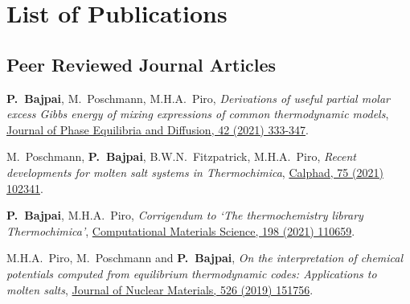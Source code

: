 \chapter*{List of Publications}
\label{publications}


\section*{Peer Reviewed Journal Articles}
\vspace*{1em}
\begin{enumerate}{\small \compresslist
    \item \textbf{P.\ Bajpai}, {M.\ Poschmann}, {M.H.A.\ Piro}, \textit{Derivations of useful partial molar excess Gibbs energy of mixing expressions of common thermodynamic models}, \href{https://doi.org/10.1007/s11669-021-00886-w}{Journal of Phase Equilibria and Diffusion, 42 (2021) 333-347}.
    \item {M.\ Poschmann}, \textbf{P.\ Bajpai}, {B.W.N.\ Fitzpatrick}, {M.H.A.\ Piro}, \textit{Recent developments for molten salt systems in Thermochimica}, \href{https://doi.org/10.1016/j.calphad.2021.102341}{Calphad, 75 (2021) 102341}.
    \item \textbf{P.\ Bajpai}, {M.H.A.\ Piro}, \textit{Corrigendum to `The thermochemistry library Thermochimica'}, \href{https://doi.org/10.1016/j.commatsci.2021.110659}{Computational Materials Science, 198 (2021) 110659}.
    \item {M.H.A.\ Piro}, {M.\ Poschmann} and \textbf{P.\ Bajpai}, \textit{On the interpretation of chemical potentials computed from equilibrium thermodynamic codes: Applications to molten salts}, \href{https://doi.org/10.1016/j.jnucmat.2019.151756}{Journal of Nuclear Materials, 526 (2019) 151756}.
}
\end{enumerate}

